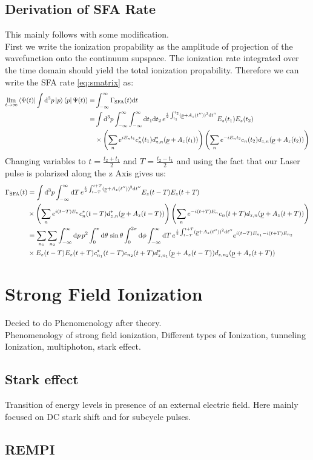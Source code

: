 \subsection{Derivation of SFA Rate}
This mainly follows \cite{Theory_NPS} with some modification.\\
First we write the ionization propability as the amplitude of projection of the wavefunction onto the continuum supspace.
The ionization rate integrated over the time domain should yield the total ionization propability.
Therefore we can write the SFA rate \eqref{eq:smatrix} as:
\begin{align*}
    \lim_{t\to\infty}\braket{\Psi(t)|\int \dd^3 p \ket{p}\bra{p}\Psi(t)} = &\int_{-\infty}^{\infty} \Gamma_{\mathrm{SFA}}(t) \dd t \\ %
    = &\int \dd^3 p \int_{-\infty}^{\infty} \int_{-\infty}^{\infty} \dd t_1  \dd t_2 \, e^{\frac{i}{2}\int_{t_1}^{t_2}(\uvec{p}+A_z(t''))^2\dd t''} E_z(t_1)E_z(t_2)\\
    &\times\left(\sum_{n}e^{iE_nt_1}c_n^*(t_1)d_{z,n}^*(\uvec{p}+A_z(t_1))\right)\left(\sum_{n}e^{-iE_nt_2}c_n(t_2)d_{z,n}(\uvec{p}+A_z(t_2))\right)
\end{align*}
Changing variables to $t=\frac{t_2+t_1}{2}$ and $T=\frac{t_2-t_1}{2}$ and using the fact that our Laser pulse is polarized along the z Axis gives us:
\begin{align*}
    \Gamma_{\mathrm{SFA}}(t) &= \int \mathrm{d}^3 p \int_{-\infty}^{\infty} \mathrm{d} T \, e^{\frac{i}{2}\int_{t-T}^{t+T}(\underline{p}+A_z(t''))^2\mathrm{d} t''} E_z(t-T) E_z(t+T)\\
    &\times\left(\sum_{n}e^{i(t-T)E_n}c_n^*(t-T)d_{z,n}^*(\underline{p}+A_z(t-T))\right)\left(\sum_{n}e^{-i(t+T)E_n}c_n(t+T)d_{z,n}(\underline{p}+A_z(t+T))\right)\\
    &= \sum_{n_1}\sum_{n_2} \int_{-\infty}^{\infty} \mathrm{d} p\,p^2\int_0^{\pi} \mathrm{d}\theta\,\sin\theta \int_0^{2\pi}\mathrm{d} \phi\int_{-\infty}^{\infty} \mathrm{d} T \, e^{\frac{i}{2}\int_{t-T}^{t+T}(\underline{p}+A_z(t''))^2\mathrm{d} t''} e^{i(t-T)E_{n_1}-i(t+T)E_{n_2}}\\
    &\times E_z(t-T) E_z(t+T)c_{n_1}^*(t-T)c_{n_2}(t+T) d_{z,n_1}^*(\underline{p}+A_z(t-T))d_{z,n_2}(\underline{p}+A_z(t+T))
\end{align*}






\newpage
\section{Strong Field Ionization}
Decied to do Phenomenology after theory.\\
Phenomenology of strong field ionization, Different types of Ionization, tunneling Ionization, multiphoton, stark effect.
\subsection{Stark effect}
Transition of energy levels in presence of an external electric field. 
Here mainly focused on DC stark shift and for subcycle pulses.
\subsection{REMPI}